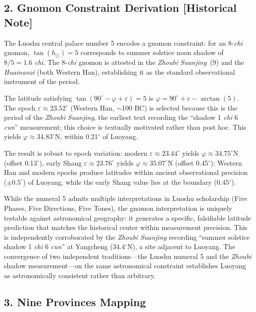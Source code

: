 \documentclass[10pt]{article}
\begin{document}
\subsection*{2. Gnomon Constraint Derivation [Historical Note]}

The Luoshu central palace number 5 encodes a gnomon constraint: for an 8-\textit{chi} gnomon, $\tan(h_\odot) = 5$ corresponds to summer solstice noon shadow of $8/5 = 1.6$ \textit{chi}. The 8-\textit{chi} gnomon is attested in the \textit{Zhoubi Suanjing}~(9) and the \textit{Huainanzi} (both Western Han), establishing it as the standard observational instrument of the period.

The latitude satisfying $\tan(90^\circ - \varphi + \varepsilon) = 5$ is $\varphi = 90^\circ + \varepsilon - \arctan(5)$. The epoch $\varepsilon \approx 23.52^\circ$ (Western Han, $\sim$100 BC) is selected because this is the period of the \textit{Zhoubi Suanjing}, the earliest text recording the ``shadow 1 \textit{chi} 6 \textit{cun}'' measurement; this choice is textually motivated rather than post hoc. This yields $\varphi \approx 34.83^\circ$N, within 0.21$^\circ$ of Luoyang.

The result is robust to epoch variation: modern $\varepsilon \approx 23.44^\circ$ yields $\varphi \approx 34.75^\circ$N (offset 0.13$^\circ$), early Shang $\varepsilon \approx 23.76^\circ$ yields $\varphi \approx 35.07^\circ$N (offset 0.45$^\circ$); Western Han and modern epochs produce latitudes within ancient observational precision ($\pm 0.5^\circ$) of Luoyang, while the early Shang value lies at the boundary (0.45$^\circ$).

While the numeral 5 admits multiple interpretations in Luoshu scholarship (Five Phases, Five Directions, Five Tones), the gnomon interpretation is uniquely testable against astronomical geography: it generates a specific, falsifiable latitude prediction that matches the historical center within measurement precision. This is independently corroborated by the \textit{Zhoubi Suanjing} recording ``summer solstice shadow 1 \textit{chi} 6 \textit{cun}'' at Yangcheng (34.4$^\circ$N), a site adjacent to Luoyang. The convergence of two independent traditions---the Luoshu numeral 5 and the \textit{Zhoubi} shadow measurement---on the same astronomical constraint establishes Luoyang as astronomically consistent rather than arbitrary.

\subsection*{3. Nine Provinces Mapping}
\end{document}
